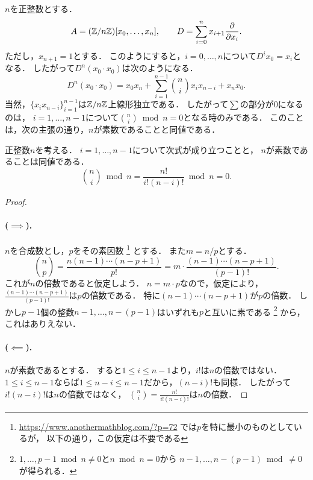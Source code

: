 \documentclass[a4paper]{jsarticle}
\begin{document}
\begin{Example}
    $n$を正整数とする．
    \[
        A=(\mathbb{Z}/n\mathbb{Z})[x_0,\dots,x_n],
        \hspace{20pt}
        D=\sum_{i=0}^{n} x_{i+1} \frac{\partial}{\partial x_{i}}.
    \]
    ただし，$x_{n+1}=1$とする．
    このようにすると，$i=0,\dots,n$について$D^i x_0=x_{i}$となる．
    したがって$D^n(x_0 \cdot x_0)$は次のようになる．
    \[ D^n(x_0 \cdot x_0)=x_0 x_n + \sum_{i=1}^{n-1} \binom{n}{i} x_i x_{n-i} + x_n x_0. \]
    当然，$\{x_i x_{n-i}\}_{i=1}^{n-1}$は$\mathbb{Z}/n\mathbb{Z}$上線形独立である．
    したがって$\sum$の部分が$0$になるのは，
    $i=1,\dots,n-1$について$\binom{n}{i} \bmod n=0$となる時のみである．
    このことは，次の主張の通り，$n$が素数であることと同値である．
\end{Example}

\begin{Prop}
    正整数$n$を考える．
    $i=1,\dots,n-1$について次式が成り立つことと，
    $n$が素数であることは同値である．
    \[ \binom{n}{i} \bmod n=\frac{n!}{i! (n-i)!} \bmod n=0. \]
\end{Prop}
\begin{proof}
    \paragraph{($\implies$).}
    $n$を合成数とし，$p$をその素因数
    \footnote
    {
        \url{https://www.anothermathblog.com/?p=72}
        では$p$を特に最小のものとしているが，
        以下の通り，この仮定は不要である
    }
    とする．
    また$m=n/p$とする．
    \[
        \binom{n}{p}
        =\frac{n(n-1)\cdots(n-p+1)}{p!}
        =m \cdot \frac{(n-1)\cdots(n-p+1)}{(p-1)!}.
    \]
    これが$n$の倍数であると仮定しよう．
    $n=m \cdot p$なので，仮定により，
    $\frac{(n-1)\cdots(n-p+1)}{(p-1)!}$は$p$の倍数である．
    特に$(n-1)\cdots(n-p+1)$が$p$の倍数．
    しかし$p-1$個の整数$n-1, \dots, n-(p-1)$はいずれも$p$と互いに素である
    \footnote
    {
        $1, \dots, p-1 \bmod n \neq 0$と$n \bmod n=0$から
        $n-1, \dots, n-(p-1) \bmod \neq 0$が得られる．
    }
    から，
    これはありえない．

    \paragraph{($\impliedby$).}
    $n$が素数であるとする．
    すると$1 \leq i \leq n-1$より，$i!$は$n$の倍数ではない．
    $1 \leq i \leq n-1$ならば$1 \leq n-i \leq n-1$だから，$(n-i)!$も同様．
    したがって$i! (n-i)!$は$n$の倍数ではなく，
    $\binom{n}{i}=\frac{n!}{i! (n-i)!}$は$n$の倍数．
\end{proof}
\end{document}
